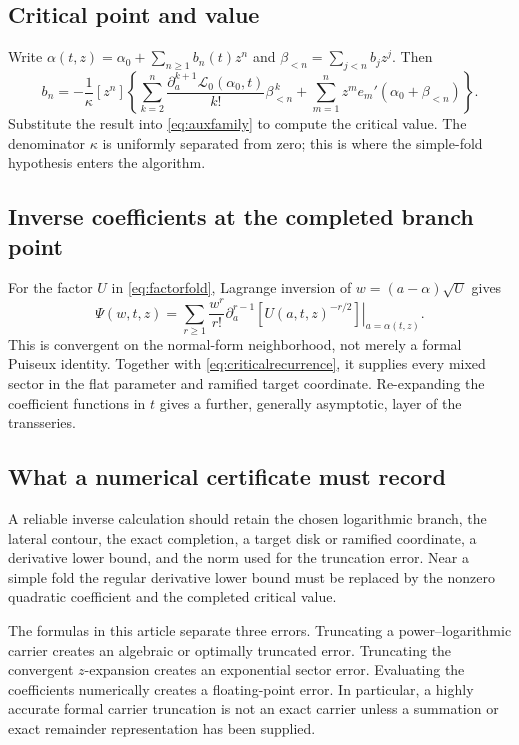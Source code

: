 \documentclass[11pt,a4paper]{article}
\numberwithin{equation}{section}
\theoremstyle{definition}
\theoremstyle{remark}
\newcommand{\cL}{\mathcal L}
\begin{document}
\subsection{Critical point and value}
Write
$\alpha(t,z)=\alpha_0+\sum_{n\geq1}b_n(t)z^n$ and
$\beta_{<n}=\sum_{j<n}b_jz^j$. Then
\begin{equation}
 b_n=-\frac1\kappa[z^n]\left\{
 \sum_{k=2}^{n}\frac{\partial_a^{k+1}\cL_0(\alpha_0,t)}{k!}
                      \beta_{<n}^{\,k}
 +\sum_{m=1}^{n}z^m e_m'(\alpha_0+\beta_{<n})\right\}.
 \label{eq:criticalrecurrence}
\end{equation}
Substitute the result into \eqref{eq:auxfamily} to compute the critical
value. The denominator $\kappa$ is uniformly separated from zero;
this is where the simple-fold hypothesis enters the algorithm.

\subsection{Inverse coefficients at the completed branch point}
For the factor $U$ in \eqref{eq:factorfold}, Lagrange inversion of
$w=(a-\alpha)\sqrt{U}$ gives
\begin{equation}
 \Psi(w,t,z)=\sum_{r\geq1}\frac{w^r}{r!}
 \left.
 \partial_a^{r-1}\left[U(a,t,z)^{-r/2}\right]
 \right|_{a=\alpha(t,z)}.
 \label{eq:PsiLagrange}
\end{equation}
This is convergent on the normal-form neighborhood, not merely a
formal Puiseux identity. Together with
\eqref{eq:criticalrecurrence}, it supplies every mixed sector in the
flat parameter and ramified target coordinate. Re-expanding the
coefficient functions in $t$ gives a further, generally asymptotic,
layer of the transseries.

\subsection{What a numerical certificate must record}
A reliable inverse calculation should retain the chosen logarithmic
branch, the lateral contour, the exact completion, a target disk or
ramified coordinate, a derivative lower bound, and the norm used for
the truncation error. Near a simple fold the regular derivative lower
bound must be replaced by the nonzero quadratic coefficient and the
completed critical value.

The formulas in this article separate three errors. Truncating a
power--logarithmic carrier creates an algebraic or optimally truncated
error. Truncating the convergent $z$-expansion creates an exponential
sector error. Evaluating the coefficients numerically creates a
floating-point error. In particular, a highly accurate formal carrier
truncation is not an exact carrier unless a summation or exact
remainder representation has been supplied.
\end{document}
